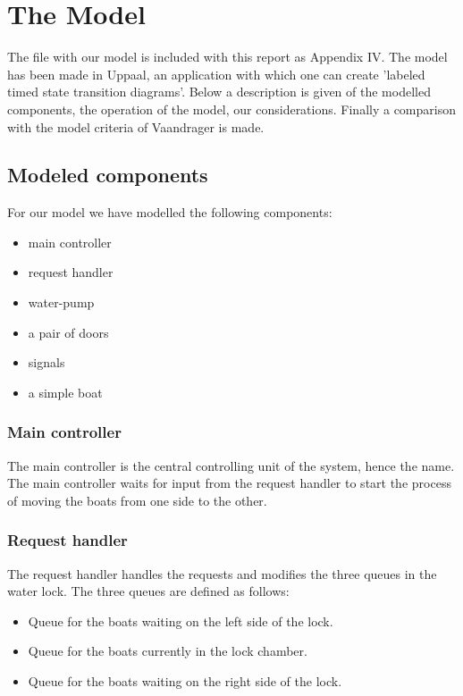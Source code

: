 \documentclass{article}
\begin{document}
\newpage
\section{The Model}
The file with our model is included with this report as Appendix IV. The model has been made in Uppaal, an application with which one can create 'labeled timed state transition diagrams'. Below a description is given of the modelled components, the operation of the model, our considerations. Finally a comparison with the model criteria of Vaandrager is made. 

    \subsection{Modeled components} \label{subsec:modelcomp}
        For our model we have modelled the following components:
        \begin{itemize}
            \item main controller
            \item request handler
            \item water-pump
            \item a pair of doors
            \item signals
            \item a simple boat
        \end{itemize}
        
        \subsubsection{Main controller}
            The main controller is the central controlling unit of the system, hence the name. The main controller waits for input from the request handler to start the process of moving the boats from one side to the other.
        \subsubsection{Request handler}
            The request handler handles the requests and modifies the three queues in the water lock. The three queues are defined as follows:
            \begin{itemize}
                \item Queue for the boats waiting on the left side of the lock.
                \item Queue for the boats currently in the lock chamber.
                \item Queue for the boats waiting on the right side of the lock.
            \end{itemize}
\end{document}
